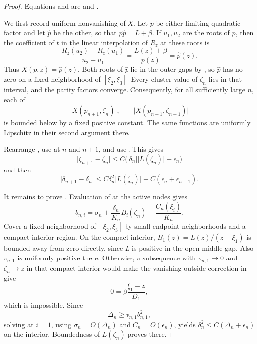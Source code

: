 \documentclass[11pt]{article}
\begin{document}
\begin{proof}
Equations  and
 are
 and
.

We first record uniform nonvanishing of \(X\).  Let \(p\) be either
limiting quadratic factor and let \(\widehat p\) be the other, so that
\(p\widehat p=L+\beta\).  If \(u_1,u_2\) are the roots of \(p\), then the
coefficient of \(t\) in the linear interpolation of \(R_z\) at these roots
is
\[
 \frac{R_z(u_2)-R_z(u_1)}{u_2-u_1}
 =\frac{L(z)+\beta}{p(z)}
 =\widehat p(z).
\tag{42}\label{eq:X-limit}
\]
Thus \(X(p,z)=\widehat p(z)\).  Both roots of \(\widehat p\) lie in the
outer gaps by , so \(\widehat p\) has no
zero on a fixed neighborhood of \([\xi_2,\xi_3]\).  Every cluster value of
\(\zeta_n\) lies in that interval, and the parity factors converge.
Consequently, for all sufficiently large \(n\), each of
\[
 \lvert X(p_{n+1},\zeta_n)\rvert,\qquad
 \lvert X(p_{n+1},\zeta_{n+1})\rvert
\]
is bounded below by a fixed positive constant.  The same functions are
uniformly Lipschitz in their second argument there.

Rearrange , use
 at \(n\) and \(n+1\), and use
.  This gives
\[
 \lvert\zeta_{n+1}-\zeta_n\rvert
 \leq C\bigl(\lvert\delta_n\rvert\lvert L(\zeta_n)\rvert+
              \epsilon_n\bigr)
\tag{43}\label{eq:zeta-forced-bound}
\]
and then
\[
 \lvert\delta_{n+1}-\delta_n\rvert
 \leq C\delta_n^2\lvert L(\zeta_n)\rvert+
       C(\epsilon_n+\epsilon_{n+1}).
\tag{44}\label{eq:variation-before-energy}
\]

It remains to prove .  Evaluation of
 at the active nodes gives
\[
 b_{n,i}
 =\sigma_n+\frac{\delta_n}{K_n}B_i(\zeta_n)
       -\frac{C_n(\xi_i)}{K_n}.
\tag{45}\label{eq:active-error-representation}
\]
Cover a fixed neighborhood of \([\xi_2,\xi_3]\) by small endpoint
neighborhoods and a compact interior region.  On the compact interior,
\(B_1(z)=L(z)/(z-\xi_1)\) is bounded away from zero directly, since
\(L\) is positive in the open middle gap.  Also \(v_{n,1}\) is uniformly
positive there.  Otherwise, a subsequence with
\(v_{n,1}\to0\) and \(\zeta_n\to z\) in that compact interior would make
the vanishing outside correction in  give
\[
 0=\beta\frac{\xi_1-z}{D_1},
\]
which is impossible.  Since
\[
 \Delta_n\geq v_{n,1}b_{n,1}^2,
\tag{46}\label{eq:active-energy}
\]
solving  at \(i=1\), using
\(\sigma_n=O(\Delta_n)\) and \(C_n=O(\epsilon_n)\), yields
\(\delta_n^2\leq C(\Delta_n+\epsilon_n)\) on the interior.  Boundedness of
\(L(\zeta_n)\) proves  there.


\end{proof}
\end{document}
